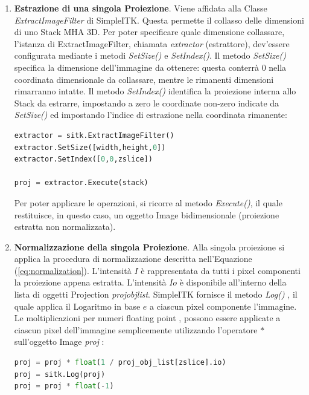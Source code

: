 \documentclass[a4paper,12pt, doubleside]{report}
\begin{document}
                \begin{enumerate}
                    \item \textbf{Estrazione di una singola Proiezione}. Viene affidata alla Classe \textit{ExtractImageFilter} \cite{sitk-estractor} di SimpleITK. Questa permette il collasso delle dimensioni di uno Stack MHA 3D. Per poter specificare quale dimensione collassare, l'istanza di ExtractImageFilter, chiamata \textit{extractor} (estrattore), dev'essere configurata mediante i metodi \textit{SetSize()} e \textit{SetIndex()}. Il metodo \textit{SetSize()} specifica la dimensione dell'immagine da ottenere: questa conterrà $0$ nella coordinata dimensionale da collassare, mentre le rimanenti dimensioni rimarranno intatte. Il metodo \textit{SetIndex()} identifica la proiezione interna allo Stack da estrarre, impostando a zero le coordinate non-zero indicate da \textit{SetSize()} ed impostando l'indice di estrazione nella coordinata rimanente:
                    
                    \begin{lstlisting}[language=python, frame=bt]
extractor = sitk.ExtractImageFilter()
extractor.SetSize([width,height,0])
extractor.SetIndex([0,0,zslice])

proj = extractor.Execute(stack)
                    \end{lstlisting} 
                    
                    Per poter applicare le operazioni, si ricorre al metodo \textit{Execute()}, il quale restituisce, in questo caso, un oggetto Image bidimensionale (proiezione estratta non normalizzata).
                    
                    \item \textbf{Normalizzazione della singola Proiezione}. Alla singola proiezione si applica la procedura di normalizzazione descritta nell'Equazione (\ref{eq:normalization}). L'intensità $I$ è rappresentata da tutti i pixel componenti la proiezione appena estratta. L'intensità $Io$ è disponibile all'interno della lista di oggetti Projection \textit{proj\textunderscore obj\textunderscore list}. SimpleITK fornisce il metodo \textit{Log()} \cite{sitk-log}, il quale applica il Logaritmo in base $e$ a ciascun pixel componente l'immagine. 
                    Le moltiplicazioni per numeri floating point \cite{python-floating-point}, possono essere applicate a ciascun pixel dell'immagine semplicemente utilizzando l'operatore $*$ \cite{sitk-star-operator} sull'oggetto Image \textit{proj} :
                    \begin{lstlisting}[language=python, frame=bt]
proj = proj * float(1 / proj_obj_list[zslice].io)
proj = sitk.Log(proj)
proj = proj * float(-1)
                    \end{lstlisting}
                    

\end{enumerate}
\end{document}
